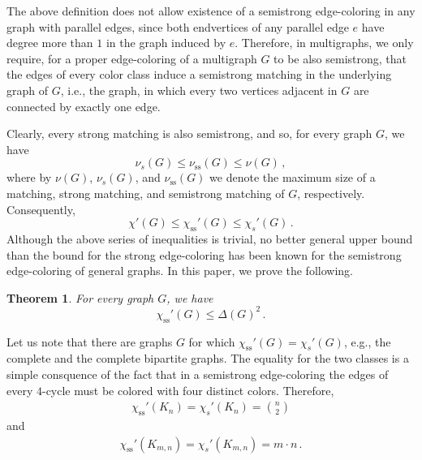 \documentclass[12pt,a4paper]{article}
\newtheorem{theorem}{Theorem}
\newcommand{\chis}[1]{\ensuremath{\chi_{s}'(#1)}}
\newcommand{\chiss}[1]{\ensuremath{\chi_{\mathrm{ss}}'(#1)}}
\begin{document}
The above definition does not allow existence of a semistrong edge-coloring in any graph with parallel edges, 
since both endvertices of any parallel edge $e$ have degree more than $1$ in the graph induced by $e$.
Therefore, in multigraphs, we only require, for a proper edge-coloring of a multigraph $G$ to be also semistrong,
that the edges of every color class induce a semistrong matching in the underlying graph of $G$, 
i.e., the graph, in which every two vertices adjacent in $G$ are connected by exactly one edge.

Clearly, every strong matching is also semistrong, and so, for every graph $G$, we have
$$
	\nu_{s}(G) \le \nu_{\mathrm{ss}}(G) \le \nu(G)\,,
$$
where by $\nu(G)$, $\nu_{s}(G)$, and $\nu_{\mathrm{ss}}(G)$ 
we denote the maximum size of a matching, strong matching, and semistrong matching of $G$, respectively. 
Consequently,
$$
	\chi'(G) \le \chiss{G} \le \chis{G}\,.
$$
Although the above series of inequalities is trivial, 
no better general upper bound than the bound for the strong edge-coloring has been known for the semistrong edge-coloring of general graphs.
In this paper, we prove the following.
\begin{theorem}
	\label{thm:main}
	For every graph $G$, we have
	$$
		\chiss{G} \le \Delta(G)^2\,.
	$$
\end{theorem}

Let us note that there are graphs $G$ for which $\chiss{G} = \chis{G}$,
e.g., the complete and the complete bipartite graphs. 
The equality for the two classes is a simple consquence of the fact 
that in a semistrong edge-coloring the edges of every $4$-cycle must be colored with four distinct colors.
Therefore, 
\begin{align*}
	\chiss{K_n} = \chis{K_n} = {n \choose 2}
\end{align*}
and 
\begin{align}
	\label{eq:bip}
	\chiss{K_{m,n}} = \chis{K_{m,n}} = m \cdot n\,.
\end{align}
\end{document}

